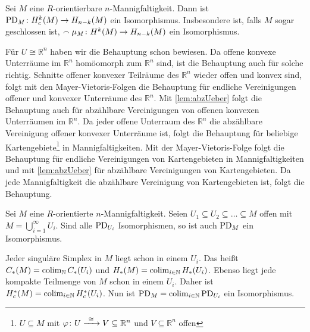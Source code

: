 \begin{satz}
	Sei $M$ eine $R$-orientierbare $n$-Mannigfaltigkeit. 
	Dann ist $\operatorname{PD}_M \colon H^k_c(M) \to H_{n-k}(M)$ ein Isomorphismus.
	Insbesondere ist, falls $M$ sogar geschlossen ist, $\smallfrown \mu_M \colon H^k(M) \to H_{n-k}(M)$ ein Isomorphismus.
\end{satz}
\begin{beweis}
	Für $U \cong \mathbb{R}^n$ haben wir die Behauptung schon bewiesen.
	Da offene konvexe Unterräume im $\mathbb{R}^n$ homöomorph zum $\mathbb{R}^n$ sind, ist die Behauptung auch für solche richtig.
	Schnitte offener konvexer Teilräume des $\mathbb{R}^n$ wieder offen und konvex sind, folgt mit den Mayer-Vietoris-Folgen die Behauptung für endliche Vereinigungen offener und konvexer Unterräume des $\mathbb{R}^n$.
	Mit \autoref{lem:abzUeber} folgt die Behauptung auch für abzählbare Vereinigungen von offenen konvexen Unterräumen im $\mathbb{R}^n$.
	Da jeder offene Unterraum des $\mathbb{R}^n$ die abzählbare Vereinigung offener konvexer Unterräume ist, folgt die Behauptung für beliebige Kartengebiete\footnote{$U \subseteq M$ mit $\varphi \colon U \grenzw{\cong} V \subseteq \mathbb{R}^n$ und $V \subseteq \mathbb{R}^n$ offen} in Mannigfaltigkeiten.
	Mit der Mayer-Vietoris-Folge folgt die Behauptung für endliche Vereinigungen von Kartengebieten in Mannigfaltigkeiten und mit \autoref{lem:abzUeber} für abzählbare Vereinigungen von Kartengebieten.
	Da jede Mannigfaltigkeit die abzählbare Vereinigung von Kartengebieten ist, folgt die Behauptung.
\end{beweis}

\begin{lemma}[label=lem:abzUeber]
	Sei $M$ eine $R$-orientierte $n$-Mannigfaltigkeit. 
	Seien $U_1 \subseteq U_2 \subseteq \ldots \subseteq M$ offen mit $M= \bigcup_{i=1}^\infty U_i$.
	Sind alle $\operatorname{PD}_{U_i}$ Isomorphismen, so ist auch $\operatorname{PD}_M$ ein Isomorphismus.
\end{lemma}
\begin{beweis}
	Jeder singuläre Simplex in $M$ liegt schon in einem $U_i$. 
	Das heißt $C_*(M)=\operatorname*{colim}_{\mathbb{N}} C_*(U_i)$ und $H_*(M)= \operatorname*{colim}_{i \in \mathbb{N}} H_*(U_i)$.
	Ebenso liegt jede kompakte Teilmenge von $M$ schon in einem $U_i$.
	Daher ist $H^*_c(M) = \operatorname*{colim}_{i \in \mathbb{N}} H^*_c(U_i)$. 
	Nun ist $\operatorname{PD}_M = \operatorname*{colim}_{i \in \mathbb{N}} \operatorname{PD}_{U_i}$ ein Isomorphismus.
\end{beweis}
\newpage

